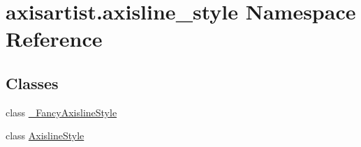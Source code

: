 \hypertarget{namespaceaxisartist_1_1axisline__style}{}\section{axisartist.\+axisline\+\_\+style Namespace Reference}
\label{namespaceaxisartist_1_1axisline__style}
\subsection*{Classes}
\begin{DoxyCompactItemize}
\item 
class \hyperlink{classaxisartist_1_1axisline__style_1_1__FancyAxislineStyle}{\+\_\+\+Fancy\+Axisline\+Style}
\item 
class \hyperlink{classaxisartist_1_1axisline__style_1_1AxislineStyle}{Axisline\+Style}
\end{DoxyCompactItemize}
